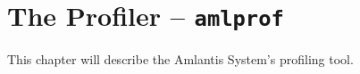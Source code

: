 
\chapter[The Profiler -- amlprof]{The Profiler -- \lstinline!amlprof!}
\label{ch:tools-amlprof}

This chapter will describe the Amlantis System's profiling tool.






